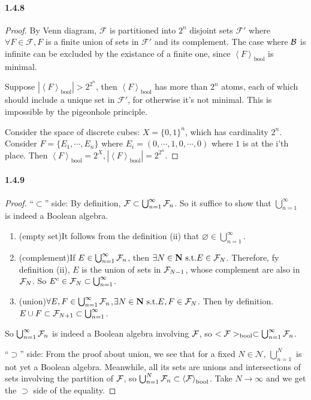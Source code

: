 \documentclass{article}
\begin{document}
\paragraph{1.4.8}
\begin{proof}
By Venn diagram, $\mathcal{F}$ is partitioned into $2^n$ disjoint sets $\mathcal{F}'$ where $\forall F\in\mathcal{F},F$ is a finite union of sets in $\mathcal{F}'$ and its complement. The case where $\mathcal{B}$ is infinite can be excluded by the existance of a finite one, since $\left< F \right>_{\text{bool}}$ is minimal. 

Suppose $|\left< F \right>_{\text{bool}}|>2^{2^n}$, then $\left< F \right>_{\text{bool}}$ has more than $2^n$ atoms, each of which should include a unique set in $\mathcal{F}'$, for otherwise it's not minimal. This is impossible by the pigeonhole principle.

Consider the space of discrete cubes: $X=\{0,1\}^n$, which has cardinality $2^n$. Consider $F=\{E_1,
\cdots,E_n\}$ where $E_i=(0,\cdots, 1,0,\cdots,0)$ where $1$ is at the i'th place. Then $\left< F \right>_{\text{bool}}=2^X, |\left< F \right>_{\text{bool}}|=2^{2^n}$.
\end{proof}

\paragraph{1.4.9}
\begin{proof}
``$\subset$'' side: By definition, $\mathcal{F}\subset \bigcup_{n=1}^{\infty}\mathcal{F}_n$. So it suffice to show that $\bigcup_{n=1}^{\infty}$ is indeed a Boolean algebra.
\begin{enumerate}
\item{(empty set)}It follows from the definition (ii) that $\varnothing\in\bigcup_{n=1}^{\infty}$.
\item{(complement)}If $E\in \bigcup_{n=1}^{\infty}\mathcal{F}_n$, then $\exists N\in\mathbf{N}\text{ s.t.} E\in \mathcal{F}_N$. Therefore, fy definition (ii), $E$ is the union of sets in $\mathcal{F}_{N-1}$, whose complement are also in $\mathcal{F}_N$. So $E^c\in \mathcal{F}_N\subset\bigcup_{n=1}^{\infty}$.
\item{(union)}$\forall E,F\in \bigcup_{n=1}^{\infty}\mathcal{F}_n$,$\exists N\in\mathbf{N}\text{ s.t.} E,F\in \mathcal{F}_N$. Then by definition. $E\cup F\subset \mathcal{F}_{N+1}\subset \bigcup_{n=1}^{\infty}$.
\end{enumerate}
So $\bigcup_{n=1}^{\infty}\mathcal{F}_n$ is indeed a Boolean algebra involving $\mathcal{F}$, so $<\mathcal{F}>_{\text{bool}}\subset\bigcup_{n=1}^{\infty}\mathcal{F}_n$.

``$\supset$'' side: From the proof about union, we see that for a fixed $N\in\mathcal{N}$, $\bigcup_{n=1}^{N}$ is not yet a Boolean algebra. Meanwhile, all its sets are unions and intersections of sets involving the partition of $\mathcal{F}$, so $\bigcup_{n=1}^{N}\mathcal{F}_n\subset \left< \mathcal{F}\right>_{\text{bool}}$. Take $N\to\infty$ and we get the $\supset$ side of the equality.
\end{proof}
\end{document}
